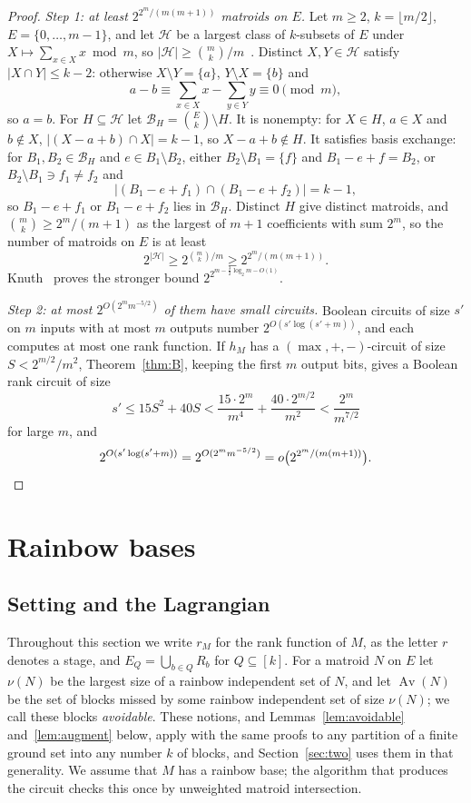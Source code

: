 \documentclass[11pt]{article}
\newcommand{\Av}{\operatorname{Av}}
\begin{document}
\begin{proof}
\emph{Step 1: at least $2^{2^{m}/(m(m+1))}$ matroids on $E$.}  Let $m\ge2$, $k=\lfloor m/2\rfloor$,
$E=\{0,\ldots,m-1\}$, and let $\mathcal H$ be a largest class of $k$-subsets of
$E$ under $X\mapsto\sum_{x\in X}x\bmod m$, so
$|\mathcal H|\ge\binom mk/m$~\cite{graham-sloane80}.  Distinct $X,Y\in\mathcal H$
satisfy $|X\cap Y|\le k-2$: otherwise $X\setminus Y=\{a\}$, $Y\setminus X=\{b\}$
and
\[
  a-b\equiv\sum_{x\in X}x-\sum_{y\in Y}y\equiv0\pmod m,
\]
so $a=b$.  For $H\subseteq\mathcal H$ let $\mathcal B_H=\binom Ek\setminus H$.  It
is nonempty: for $X\in H$, $a\in X$ and $b\notin X$, $|(X-a+b)\cap X|=k-1$, so
$X-a+b\notin H$.  It satisfies basis exchange: for
$B_1,B_2\in\mathcal B_H$ and $e\in B_1\setminus B_2$, either
$B_2\setminus B_1=\{f\}$ and $B_1-e+f=B_2$, or $B_2\setminus B_1\ni f_1\ne f_2$ and
\[
  \bigl|(B_1-e+f_1)\cap(B_1-e+f_2)\bigr|=k-1,
\]
so $B_1-e+f_1$ or $B_1-e+f_2$ lies in $\mathcal B_H$.  Distinct $H$ give distinct
matroids, and $\binom mk\ge2^{m}/(m+1)$ as the largest of $m+1$ coefficients with
sum $2^{m}$, so the number of matroids on $E$ is at least
\[
  2^{|\mathcal H|}\ge2^{\binom mk/m}\ge2^{2^{m}/(m(m+1))}.
\]
Knuth~\cite{knuth74} proves the stronger bound $2^{2^{m-\frac32\log_2m-O(1)}}$.

\emph{Step 2: at most $2^{O(2^{m}m^{-5/2})}$ of them have small circuits.}  Boolean circuits of size $s'$ on $m$ inputs
with at most $m$ outputs number $2^{O(s'\log(s'+m))}$, and each computes at most
one rank function.  If $h_M$ has a $(\max,+,-)$-circuit of size
$S<2^{m/2}/m^{2}$, Theorem~\ref{thm:B}, keeping the first $m$ output bits, gives a
Boolean rank circuit of size
\[
  s'\le15S^{2}+40S<\frac{15\cdot2^{m}}{m^{4}}+\frac{40\cdot2^{m/2}}{m^{2}}<\frac{2^{m}}{m^{7/2}}
\]
for large $m$, and
\[
  2^{O(s'\log(s'+m))}=2^{O(2^{m}m^{-5/2})}=o\bigl(2^{2^{m}/(m(m+1))}\bigr).\qedhere
\]
\end{proof}

\section{Rainbow bases}
\label{sec:rainbow}

\subsection{Setting and the Lagrangian}
\label{sec:lagr}

Throughout this section we write $r_M$ for the rank function of $M$, as the letter
$r$ denotes a stage, and $E_Q=\bigcup_{b\in Q}R_b$ for $Q\subseteq[k]$.  For a
matroid $N$ on $E$ let $\nu(N)$ be the
largest size of a rainbow independent set of $N$, and let $\Av(N)$ be the set of
blocks missed by some rainbow independent set of size $\nu(N)$; we call these
blocks \emph{avoidable}.  These notions, and Lemmas~\ref{lem:avoidable}
and~\ref{lem:augment} below, apply with the same proofs to any partition of a
finite ground set into any number $k$ of blocks, and Section~\ref{sec:two} uses them
in that generality.  We assume that $M$ has a rainbow base; the algorithm that produces
the circuit checks this once by unweighted matroid intersection.
\end{document}
